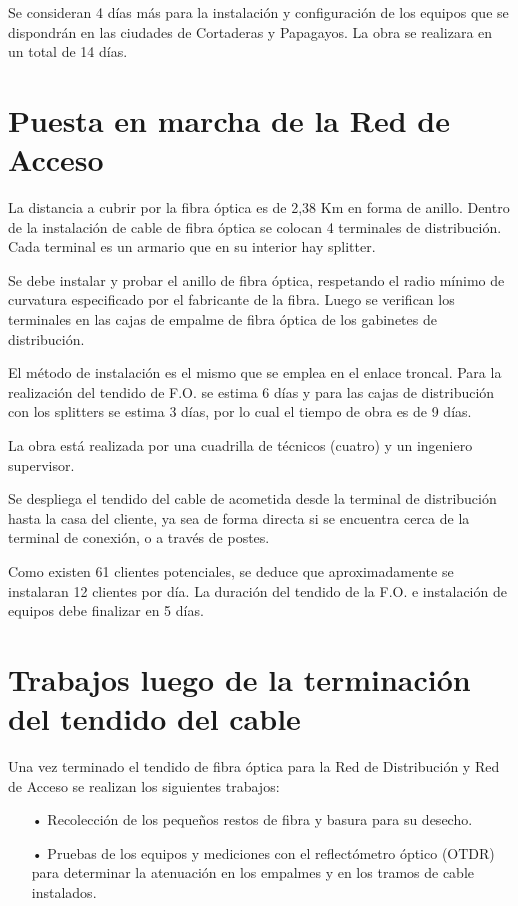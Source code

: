 Se consideran 4 días más para la instalación y configuración de los equipos que se dispondrán en las ciudades de Cortaderas y Papagayos. La obra se realizara en un total de 14 días.

\section{Puesta en marcha de la Red de Acceso}
La distancia a cubrir por la fibra óptica es de 2,38 Km en forma de anillo. Dentro de la instalación de cable de fibra óptica se colocan 4 terminales de distribución. Cada terminal es un armario que en su interior hay splitter.

Se debe instalar y probar el anillo de fibra óptica, respetando el radio mínimo de curvatura especificado por el fabricante de la fibra. 
Luego se verifican los terminales en las cajas de empalme de fibra óptica de los gabinetes de distribución.

El método de instalación es el mismo que se emplea en el enlace troncal. Para la realización del tendido de F.O. se estima 6 días y para las cajas de distribución con los splitters se estima 3 días, por lo cual el tiempo de obra es de 9 días.

La obra está realizada por una cuadrilla de técnicos (cuatro) y un ingeniero supervisor.

Se despliega el tendido del cable de acometida desde la terminal de distribución hasta la casa del cliente, ya sea de forma directa si se encuentra cerca de la terminal de conexión, o a través de postes.

Como existen 61 clientes potenciales, se deduce que aproximadamente se instalaran 12 clientes por día. La duración del tendido de la F.O. e instalación de equipos debe finalizar en 5 días.
\section{Trabajos luego de la terminación del tendido del cable}

Una vez terminado el tendido de fibra óptica para la Red de Distribución y Red de Acceso se realizan los siguientes trabajos:

\begin{itemize}

\item[•]Recolección de los pequeños restos de fibra y basura para su desecho.

\item[•]Pruebas de los equipos y mediciones con el reflectómetro óptico (OTDR) para determinar la atenuación en los empalmes y en los tramos de cable instalados.
\end{itemize}


